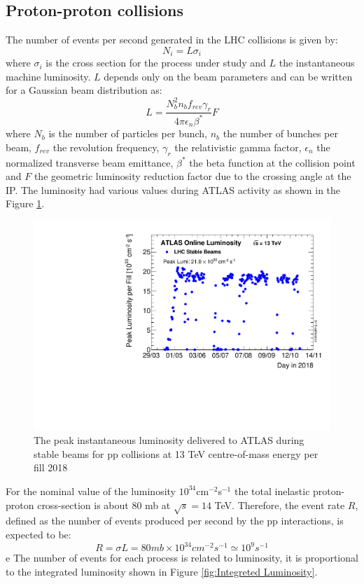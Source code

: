 \documentclass[a4paper, oneside]{book}
\begin{document}
				\subsection{Proton-proton collisions}
					The number of events per second generated in the LHC collisions is given by:
					$$
					N_{i} = L\sigma_{i}
					$$
					where $\sigma_{i}$ is the cross section for the process under study and $L$ the instantaneous machine luminosity. $L$ depends only on the beam parameters and can be written for a Gaussian beam distribution as: 
					$$
					L = \frac{N_b^2n_bf_{rev}\gamma_r}{4\pi\epsilon_n\beta^*}F
					$$
					where $N_b$ is the number of particles per bunch, $n_b$ the number of bunches per beam, $f_{rev}$ the revolution frequency, $\gamma_r$ the relativistic gamma factor, $\epsilon_n$ the normalized transverse beam emittance, $\beta^*$ the beta function at the collision point and $F$ the geometric luminosity reduction factor due to the crossing angle at the IP. The luminosity had various values during ATLAS activity as shown in the Figure \ref{fig:lum}.
					
					\begin{figure}
						\centering
						\includegraphics[width=0.5\textheight]{tesi_images/insta_lum_2018.pdf}
						\caption{The peak instantaneous luminosity delivered to ATLAS during stable beams for pp collisions at 13 TeV centre-of-mass energy per fill 2018}
						\label{fig:lum}
					\end{figure}
					
					For the nominal value of the luminosity $10^{34}$cm$^{-2}$s$^{-1}$ the total inelastic proton-proton cross-section is about 80 mb \cite{LHC introduction}  at $\sqrt{s} = 14$ TeV. Therefore, the event rate $R$, defined as the number of events produced per second by the pp interactions, is expected to be:
					$$
					R = \sigma L = 80 mb\times10^{34}cm^{-2}s^{-1} \simeq 10^{9}s^{-1}
					$$e 
					The number of events for each process is related to luminosity, it is proportional to the integrated luminosity shown in Figure \ref{fig:Integreted Luminosity}.
					
\end{document}
